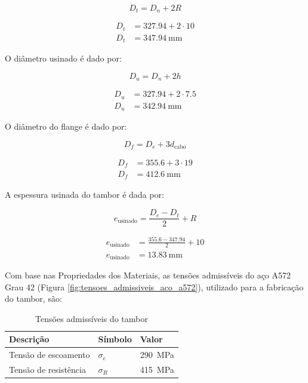 \begin{equation}
  D_t = D_n + 2 R
  \label{eq:diametro_primitivo}
\end{equation}

\begin{align*}
  D_t & = \num{327.94} + 2 \cdot 10         \\
  D_t & = \boxed{\SI{347.94}{\milli\meter}}
\end{align*}

O diâmetro usinado é dado por:

\begin{equation}
  D_u = D_n + 2 h
  \label{eq:diametro_usinado}
\end{equation}

\begin{align*}
  D_u & = \num{327.94} + 2 \cdot \num{7.5}  \\
  D_u & = \boxed{\SI{342.94}{\milli\meter}}
\end{align*}

O diâmetro do flange é dado por:

\begin{equation}
  D_f = D_e + 3 d_{\text{cabo}}
  \label{eq:diametro_flange}
\end{equation}

\begin{align*}
  D_f & = \num{355.6} + 3 \cdot 19         \\
  D_f & = \boxed{\SI{412.6}{\milli\meter}}
\end{align*}

A espessura usinada do tambor é dada por:

\begin{equation}
  e_{\text{usinado}} = \frac{D_e - D_t}{2} + R
  \label{eq:espessura_usinada}
\end{equation}

\begin{align*}
  e_{\text{usinado}} & = \frac{\num{355.6} - \num{347.94}}{2} + 10 \\
  e_{\text{usinado}} & = \boxed{\SI{13.83}{\milli\meter}}
\end{align*}

Com base nas Propriedades dos Materiais, as tensões admissíveis do aço A572 Grau 42 (Figura \ref{fig:tensoes_admissiveis_aco_a572}), utilizado para a fabricação do tambor, são:

\begin{table}[H]
  \centering
  \caption{Tensões admissíveis do tambor}
  \label{tab:tensoes_tambor}
  \begin{tabularx}{\textwidth}{>{\centering\arraybackslash}X>{\centering\arraybackslash}X>{\centering\arraybackslash}X}
    \toprule
    Descrição             & Símbolo    & Valor                  \\
    \midrule
    Tensão de escoamento  & $\sigma_e$ & \SI{290}{\mega\pascal} \\
    Tensão de resistência & $\sigma_R$ & \SI{415}{\mega\pascal} \\
    \bottomrule
  \end{tabularx}
\end{table}

